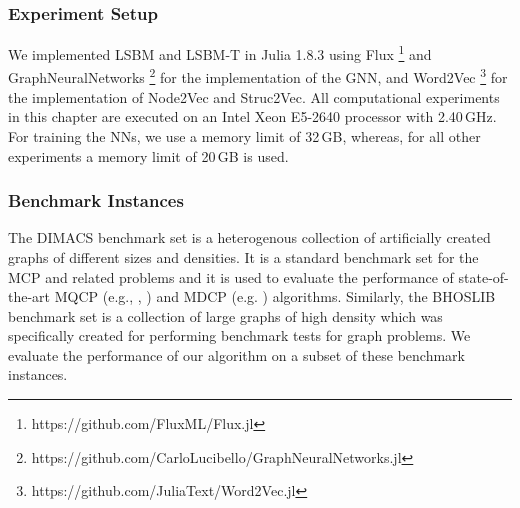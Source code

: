 \documentclass[draft,final]{vutinfth} %
\begin{document}
\subsubsection{Experiment Setup}
We implemented LSBM and LSBM-T in Julia 1.8.3 using Flux \footnote{https://github.com/FluxML/Flux.jl} and GraphNeuralNetworks \footnote{https://github.com/CarloLucibello/GraphNeuralNetworks.jl}\cite{Lucibello2021GNN} for the implementation of the GNN, and Word2Vec \footnote{https://github.com/JuliaText/Word2Vec.jl} for the implementation of Node2Vec and Struc2Vec. All computational experiments in this chapter are executed on an Intel Xeon E5-2640 processor with 2.40\,GHz. For training the NNs, we use a memory limit of 32\,GB, whereas, for all other experiments a memory limit of 20\,GB is used. 

\subsubsection{Benchmark Instances}
The DIMACS benchmark set is a heterogenous collection of artificially created graphs of different sizes and densities. It is a standard benchmark set for the MCP and related problems and it is used to evaluate the performance of state-of-the-art MQCP (e.g., \cite{peng_solving_2021}, \cite{chen_nuqclq_2021}) and MDCP (e.g. \cite{chen2021computing}) algorithms. Similarly, the BHOSLIB benchmark set is a collection of large graphs of high density which was specifically created for performing benchmark tests for graph problems. 
We evaluate the performance of our algorithm on a subset of these benchmark instances. 

\end{document}

